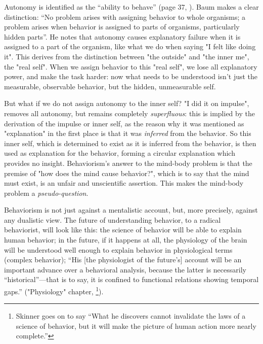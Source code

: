 \documentclass[letterpaper,11pt,twocolumn]{article}
\begin{document}
Autonomy is identified as the \enquote{ability to behave} (page 37, \cite{baumUnderstandingBehaviorismBehavior2017}). Baum makes a clear distinction: \enquote{No problem arises with assigning behavior to whole organisms; a problem arises when behavior is assigned to parts of organisms, particularly hidden parts}. He notes that autonomy causes explanatory failure when it is assigned to a part of the organism, like what we do when saying "I felt like doing it". This derives from the distinction between "the outside" and "the inner me", the "real self". When we assign behavior to this "real self", we lose all explanatory power, and make the task harder: now what needs to be understood isn't just the measurable, observable behavior, but the hidden, unmeasurable self.

But what if we do not assign autonomy to the inner self? "I did it on impulse", removes all autonomy, but remains completely \textit{superfluous}: this is implied by the derivation of the impulse or inner self, as the reason why it was mentioned as "explanation" in the first place is that it was \textit{inferred} from the behavior. So this inner self, which is determined to exist as it is inferred from the behavior, is then used as explanation for the behavior, forming a circular explanation which provides no insight. Behaviorism's answer to the mind-body problem is that the premise of "how does the mind cause behavior?", which is to say that the mind must exist, is an unfair and unscientific assertion. This makes the mind-body problem a \textit{pseudo-question}.

Behaviorism is not just against a mentalistic account, but, more precisely, against any dualistic view. The future of understanding behavior, to a radical behaviorist, will look like this: the science of behavior will be able to explain human behavior; in the future, if it happens at all, the physiology of the brain will be understood well enough to explain behavior in physiological terms (complex behavior); \enquote{His [the physiologist of the future's] account will be an important advance over a behavioral analysis, because the latter is necessarily “historical”—that is to say, it is confined to functional relations showing temporal gaps.} ("Physiology" chapter, \cite{skinnerBehaviorism1976}\footnote{Skinner goes on to say \enquote{What he discovers cannot invalidate the laws of a science of behavior, but it will make the picture of human action more nearly complete.}}).
\end{document}
